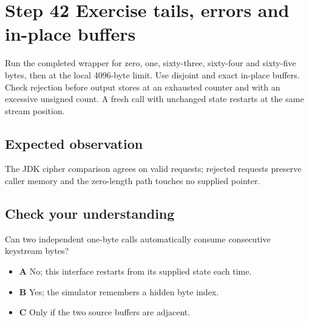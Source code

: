 \section{Step 42 Exercise tails, errors and in-place buffers}\label{chacha-s42}

Run the completed wrapper for zero, one, sixty-three, sixty-four and sixty-five bytes, then at the local 4096-byte limit. Use disjoint and exact in-place buffers. Check rejection before output stores at an exhausted counter and with an excessive unsigned count. A fresh call with unchanged state restarts at the same stream position.

\subsection{Expected observation}
The JDK cipher comparison agrees on valid requests; rejected requests preserve caller memory and the zero-length path touches no supplied pointer.

\subsection{Check your understanding}
Can two independent one-byte calls automatically consume consecutive keystream bytes?

\begin{itemize}
  \item \textbf{A} No; this interface restarts from its supplied state each time.
  \item \textbf{B} Yes; the simulator remembers a hidden byte index.
  \item \textbf{C} Only if the two source buffers are adjacent.
\end{itemize}
